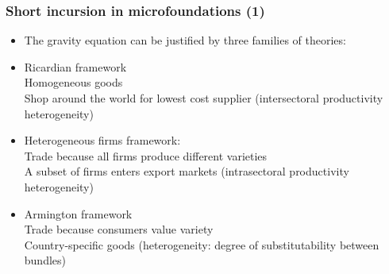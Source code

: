 \documentclass{beamer}
\begin{document}
\begin{frame}[plain]\frametitle{Short incursion in microfoundations (1)}
\begin{itemize}
\item The gravity equation can be justified by three families of theories:
\vspace{0.3cm}
\item Ricardian framework 
\\ Homogeneous goods
\\ Shop around the world for lowest cost supplier (intersectoral productivity heterogeneity)
\vspace{0.3cm}
\item Heterogeneous firms framework: 
\\ Trade because all firms produce different varieties
\\ A subset of firms enters export markets (intrasectoral productivity heterogeneity)
\vspace{0.3cm}
\item Armington framework 
\\ Trade because consumers value variety 
\\ Country-specific goods (heterogeneity: degree of substitutability between bundles)
\end{itemize}
\end{frame}
\end{document}
